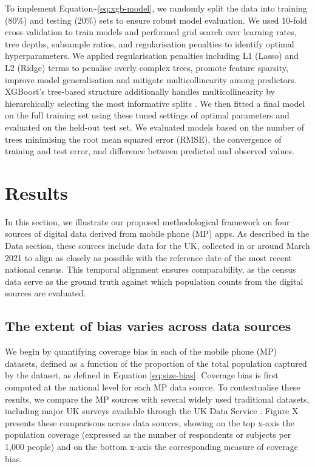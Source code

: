 \documentclass[]{rsos}%
\begin{document}
To implement Equation\textasciitilde{}\ref{eq:xgb-model}, we randomly split the data
into training (80\%) and testing (20\%) sets to ensure robust model
evaluation. We used 10-fold cross validation to train models and
performed grid search over learning rates, tree depths, subsample
ratios, and regularisation penalties to identify optimal
hyperparameters. We applied regularisation penalties including L1
(Lasso) and L2 (Ridge) terms to penalise overly complex trees, promote
feature sparsity, improve model generalisation and mitigate
multicollinearity among predictors. XGBoost's tree-based structure
additionally handles multicollinearity by hierarchically selecting the
most informative splits \citep{chen2016}. We then fitted a final model on the
full training set using these tuned settings of optimal parameters and
evaluated on the held-out test set. We evaluated models based on the
number of trees minimising the root mean squared error (RMSE), the
convergence of training and test error, and difference between predicted
and observed values.

\section{Results}\label{results}

In this section, we illustrate our proposed methodological framework on
four sources of digital data derived from mobile phone (MP) apps. As
described in the Data section, these sources include data for the UK,
collected in or around March 2021 to align as closely as possible with
the reference date of the most recent national census. This temporal
alignment ensures comparability, as the census data serve as the ground
truth against which population counts from the digital sources are
evaluated.

\subsection{The extent of bias varies across data sources}\label{the-extent-of-bias-varies-across-data-sources}

We begin by quantifying coverage bias in each of the mobile phone (MP)
datasets, defined as a function of the proportion of the total
population captured by the dataset, as defined in Equation
\ref{eq:size-bias}. Coverage bias is first computed at the national
level for each MP data source. To contextualise these results, we
compare the MP sources with several widely used traditional datasets,
including major UK surveys available through the UK Data Service
\citep{ukdataserviceSurveysData}. Figure X presents these comparisons across
data sources, showing on the top x-axis the population coverage
(expressed as the number of respondents or subjects per 1,000 people)
and on the bottom x-axis the corresponding measure of coverage bias.
\end{document}
